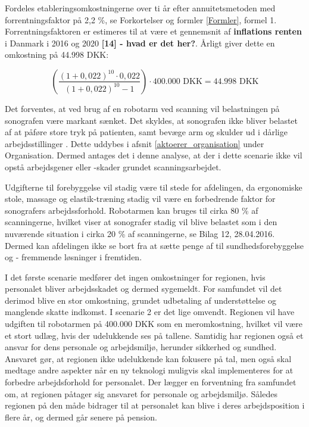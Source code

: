 Fordeles etableringsomkostningerne over ti år efter annuitetsmetoden med forrentningsfaktor på 2,2 \%, se Forkortelser og formler \ref{Formler}, formel 1. Forrentningsfaktoren er estimeres til at være et gennemsnit af \textbf{inflations renten} i Danmark i 2016 og 2020 \textbf{[14] - hvad er det her?}. Årligt giver dette en omkostning på 44.998 DKK:

\begin{equation}
\left(\frac{(1+0,022)^{10}\cdot0,022}{(1+0,022)^{10}-1}\right)\cdot400.000 \text{ DKK}=44.998 \text{ DKK}
\end{equation}

Det forventes, at ved brug af en robotarm ved scanning vil belastningen på sonografen være markant sænket. Det skyldes, at sonografen ikke bliver belastet af at påføre store tryk på patienten, samt bevæge arm og skulder ud i dårlige arbejdsstillinger \cite{31}. Dette uddybes i afsnit \ref{aktoerer_organisation} under Organisation. Dermed antages det i denne analyse, at der i dette scenarie ikke vil opstå arbejdsgener eller -skader grundet scanningsarbejdet. 

Udgifterne til forebyggelse vil stadig være til stede for afdelingen, da ergonomiske stole, massage og elastik-træning stadig vil være en forbedrende faktor for sonografers arbejdssforhold. Robotarmen kan bruges til cirka 80 \% af scanningerne, hvilket viser at sonografer stadig vil blive belastet som i den nuværende situation i cirka 20 \% af scanningerne, se Bilag 12, 28.04.2016. Dermed kan afdelingen ikke se bort fra at sætte penge af til sundhedsforebyggelse og - fremmende løsninger i fremtiden.  

I det første scenarie medfører det ingen omkostninger for regionen, hvis personalet bliver arbejdsskadet og dermed sygemeldt. For samfundet vil det derimod blive en stor omkostning, grundet udbetaling af understøttelse og manglende skatte indkomst. I scenarie 2 er det lige omvendt. Regionen vil have udgiften til robotarmen på 400.000 DKK som en meromkostning, hvilket vil være et stort udlæg, hvis der udelukkende ses på tallene. Samtidig har regionen også et ansvar for dens personale og arbejdsmiljø, herunder sikkerhed og sundhed. \\
Ansvaret gør, at regionen ikke udelukkende kan fokusere på tal, men også skal medtage andre aspekter når en ny teknologi muligvis skal implementeres for at forbedre arbejdsforhold for personalet. Der lægger en forventning fra samfundet om, at regionen påtager sig ansvaret for personale og arbejdsmiljø. Således regionen på den måde bidrager til at personalet kan blive i deres arbejdsposition i flere år, og dermed går senere på pension. 

